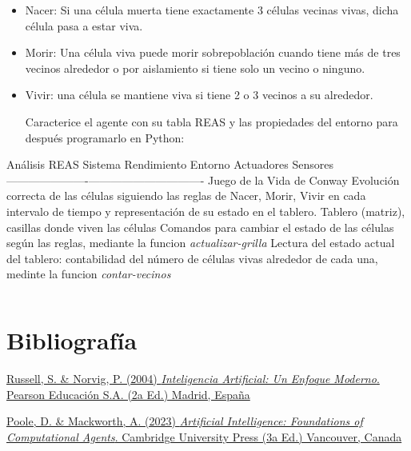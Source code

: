 \documentclass[11pt]{article}
\makeatletter
\newcommand{\boxspacing}{\kern\kvtcb@left@rule\kern\kvtcb@boxsep}
\newcommand{\prompt}[4]{
        {\ttfamily\llap{{\color{#2}[#3]:\hspace{3pt}#4}}\vspace{-\baselineskip}}
    }
\makeatother
\begin{document}
\begin{itemize}
\item
  Nacer: Si una célula muerta tiene exactamente 3 células vecinas vivas,
  dicha célula pasa a estar viva.
\item
  Morir: Una célula viva puede morir sobrepoblación cuando tiene más de
  tres vecinos alrededor o por aislamiento si tiene solo un vecino o
  ninguno.
\item
  Vivir: una célula se mantiene viva si tiene 2 o 3 vecinos a su
  alrededor.

  Caracterice el agente con su tabla REAS y las propiedades del entorno
  para después programarlo en Python:
\end{itemize}

    Análisis REAS \textbar{} Sistema \textbar{} Rendimiento \textbar{}
Entorno \textbar{} Actuadores \textbar{} Sensores \textbar{}
\textbar---------\textbar-------------\textbar---------\textbar------------\textbar----------\textbar{}
\textbar{} Juego de la Vida de Conway \textbar{} Evolución correcta de
las células siguiendo las reglas de Nacer, Morir, Vivir en cada
intervalo de tiempo y representación de su estado en el tablero.
\textbar{} Tablero (matriz), casillas donde viven las células \textbar{}
Comandos para cambiar el estado de las células según las reglas,
mediante la funcion \emph{actualizar-grilla} \textbar{} Lectura del
estado actual del tablero: contabilidad del número de células vivas
alrededor de cada una, medinte la funcion \emph{contar-vecinos}
\textbar{}

    \begin{tcolorbox}[breakable, size=fbox, boxrule=1pt, pad at break*=1mm,colback=cellbackground, colframe=cellborder]
\prompt{In}{incolor}{ }{\boxspacing}
\begin{Verbatim}[commandchars=\\\{\}]

\end{Verbatim}
\end{tcolorbox}

    \section{Bibliografía}\label{bibliografuxeda}

\href{https://www.academia.edu/8241613/Inteligencia_Aritificial_Un_Enfoque_Moderno_2da_Edici\%C3\%B3n_Stuart_J_Russell_y_Peter_Norvig}{Russell,
S. \& Norvig, P. (2004) \emph{Inteligencia Artificial: Un Enfoque
Moderno}. Pearson Educación S.A. (2a Ed.) Madrid, España}

\href{https://artint.info/3e/html/ArtInt3e.html}{Poole, D. \& Mackworth,
A. (2023) \emph{Artificial Intelligence: Foundations of Computational
Agents}. Cambridge University Press (3a Ed.) Vancouver, Canada}


    
    
    
\end{document}
